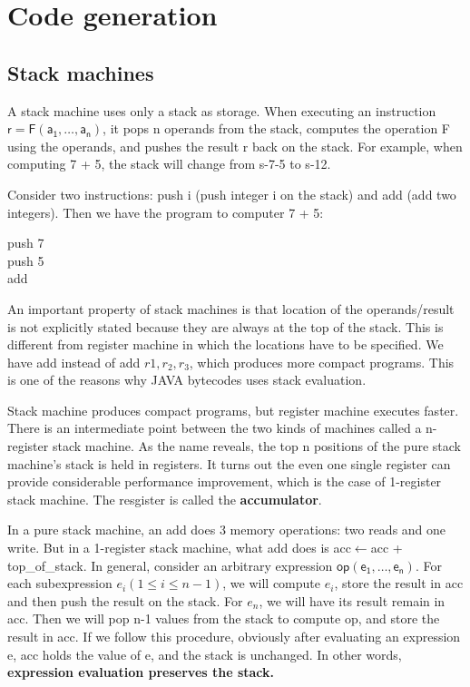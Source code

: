 \ifx\PREAMBLE\undefined


\fi
\chapter{Code generation}
\section{Stack machines}
A stack machine uses only a stack as storage. When executing an instruction $\mathsf{r = F(a_1,\dots,a_n)}$, it pops n operands from the stack, computes the operation F using the operands, and pushes the result r back on the stack. For example, when computing 7 + 5, the stack will change from s-7-5 to s-12. 

Consider two instructions: push i (push integer i on the stack) and add (add two integers). Then we have the program to computer 7 + 5:
\begin{center}
push 7\\push 5\\add
\end{center}
An important property of stack machines is that location of the operands/result is not explicitly stated because they are always at the top of the stack. This is different from register machine in which the locations have to be specified. We have add instead of add $r1, r_2, r_3$, which produces more compact programs. This is one of the reasons why JAVA bytecodes uses stack evaluation.

Stack machine produces compact programs, but register machine executes faster. There is an intermediate point between the two kinds of machines called a n-register stack machine. As the name reveals, the top n positions of the pure stack machine's stack is held in registers. It turns out the even one single register can provide considerable performance improvement, which is the case of 1-register stack machine. The resgister is called the \textbf{accumulator}. 

In a pure stack machine, an add does 3 memory operations: two reads and one write. But in a 1-register stack machine, what add does is acc$\leftarrow$acc + top\_of\_stack. In general, consider an arbitrary expression $\mathsf{op(e_1,\dots,e_n)}$. For each subexpression $e_i(1\leq i\leq n-1)$, we will compute $e_i$, store the result in acc and then push the result on the stack. For $e_n$, we will have its result remain in acc. Then we will pop n-1 values from the stack to compute op, and store the result in acc. If we follow this procedure, obviously after evaluating an expression e, acc holds the value of e, and the stack is unchanged. In other words, \textbf{expression evaluation preserves the stack.}

